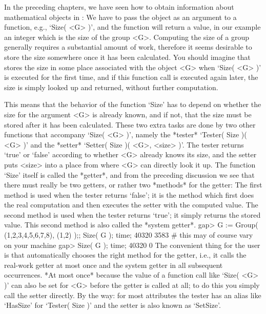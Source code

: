 



In the  preceding chapters, we have  seen how to obtain information about
mathematical objects in {\GAP}: We have to pass the object as an argument
to a function, e.g., `Size( <G> )', and the function will return a value,
in our example an integer  which is the  size of the group <G>. Computing
the size  of a  group generally  requires  a substantial amount  of work,
therefore it seems desirable to store the size somewhere once it has been
calculated. You should imagine that {\GAP} stores  the size in some place
associated  with the object  <G> when `Size( <G>  )'  is executed for the
first time, and if this function  call is executed  again later, the size
is simply looked up and returned, without further computation.

%
%
This means that the  behavior  of the  function  `Size' has to  depend on
whether the size for the argument <G> is already known,  and if not, that
the size  must be  stored after it  has been  calculated. These two extra
tasks are  done  by two other   functions that accompany `Size(   <G> )',
namely the *tester*  `Tester( Size )( <G>  )'  and the  *setter* `Setter(
Size )( <G>, <size> )'. The tester returns `true' or `false' according to
whether <G>  already knows its  size, and  the setter  puts <size> into a
place from where <G> can directly look  it up. The function `Size' itself
is called the  *getter*, and from the  preceding  discussion we see  that
there must really be two getters, or rather two *methods* for the getter:
The  first method is   used when the   tester returns `false';  it is the
method which first does the real computation and then executes the setter
with   the computed value.  The second  method is  used   when the tester
returns `true'; it simply returns the stored value. This second method is
also called the *system getter*.
\beginexample
    gap> G := Group( (1,2,3,4,5,6,7,8), (1,2) );; Size( G ); time;
    40320
    3583   # this may of course vary on your machine
    gap> Size( G ); time;
    40320
    0
\endexample
The convenient thing  for the user  is that  {\GAP} automatically chooses
the right method  for the getter, i.e.,  it calls the real-work getter at
most once  and the system getter  in all subsequent occurrences. *At most
once* because the value of a function call like `Size( <G> )' can also be
set for <G>  before the getter  is called at all; to  do this you  simply
call the setter directly. By the way: for  most attributes the tester has
an alias like `HasSize' for `Tester( Size )' and the setter is also known
as `SetSize'.

